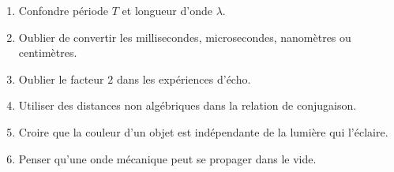 \documentclass[11pt,a4paper]{article}
\begin{document}
\begin{tcolorbox}[colframe=rougeprepa,colback=red!3!white,title={Erreurs classiques à éviter}]
\begin{enumerate}[label=\arabic*)]
  \item Confondre période $T$ et longueur d'onde $\lambda$.
  \item Oublier de convertir les millisecondes, microsecondes, nanomètres ou centimètres.
  \item Oublier le facteur $2$ dans les expériences d'écho.
  \item Utiliser des distances non algébriques dans la relation de conjugaison.
  \item Croire que la couleur d'un objet est indépendante de la lumière qui l'éclaire.
  \item Penser qu'une onde mécanique peut se propager dans le vide.
\end{enumerate}
\end{tcolorbox}
\end{document}
